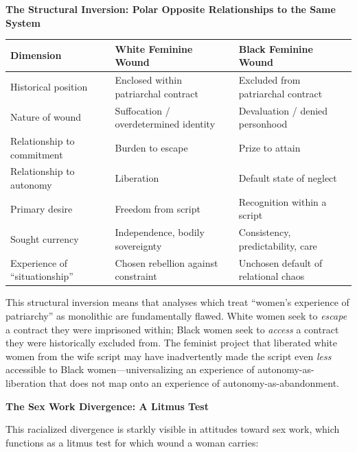 \documentclass[12pt,openany]{book}
\numberwithin{equation}{chapter}
\begin{document}
\textbf{The Structural Inversion: Polar Opposite Relationships to the Same System}

\begin{center}
\begin{tabular}{|p{2in}|p{2in}|p{2in}|}
\hline
\textbf{Dimension} & \textbf{White Feminine Wound} & \textbf{Black Feminine Wound} \\
\hline
Historical position & Enclosed within patriarchal contract & Excluded from patriarchal contract \\
\hline
Nature of wound & Suffocation / overdetermined identity & Devaluation / denied personhood \\
\hline
Relationship to commitment & Burden to escape & Prize to attain \\
\hline
Relationship to autonomy & Liberation & Default state of neglect \\
\hline
Primary desire & Freedom from script & Recognition within a script \\
\hline
Sought currency & Independence, bodily sovereignty & Consistency, predictability, care \\
\hline
Experience of ``situationship'' & Chosen rebellion against constraint & Unchosen default of relational chaos \\
\hline
\end{tabular}
\end{center}

This structural inversion means that analyses which treat ``women's experience of patriarchy'' as monolithic are fundamentally flawed. White women seek to \textit{escape} a contract they were imprisoned within; Black women seek to \textit{access} a contract they were historically excluded from. The feminist project that liberated white women from the wife script may have inadvertently made the script even \textit{less} accessible to Black women---universalizing an experience of autonomy-as-liberation that does not map onto an experience of autonomy-as-abandonment.

\textbf{The Sex Work Divergence: A Litmus Test}

This racialized divergence is starkly visible in attitudes toward sex work, which functions as a litmus test for which wound a woman carries:
\end{document}
